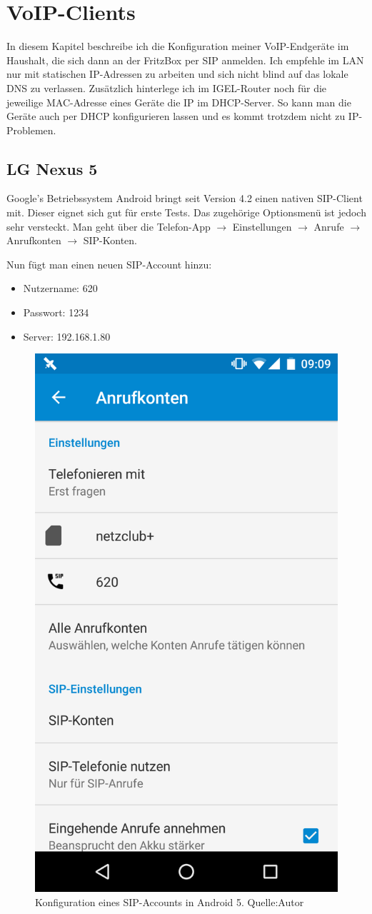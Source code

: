 \documentclass[a4paper,12pt]{scrbook}
\begin{document}
\section{VoIP-Clients}
In diesem Kapitel beschreibe ich die Konfiguration meiner VoIP-Endgeräte im Haushalt, die sich dann an der FritzBox per SIP anmelden. Ich empfehle im LAN nur mit statischen
IP-Adressen zu arbeiten und sich nicht blind auf das lokale DNS zu verlassen. Zusätzlich hinterlege ich im IGEL-Router noch für die jeweilige MAC-Adresse eines Geräte die 
IP im DHCP-Server. So kann man die Geräte auch per DHCP konfigurieren lassen und es kommt trotzdem nicht zu IP-Problemen.

\subsection{LG Nexus 5}
Google's Betriebssystem Android bringt seit Version 4.2 einen nativen SIP-Client mit. Dieser eignet sich gut für erste Tests. Das zugehörige Optionsmenü ist jedoch sehr versteckt.
Man geht über die Telefon-App $\rightarrow$ Einstellungen $\rightarrow$ Anrufe $\rightarrow$ Anrufkonten $\rightarrow$ SIP-Konten.

Nun fügt man einen neuen SIP-Account hinzu:
\begin{itemize}
 \item Nutzername: 620
 \item Passwort: 1234
 \item Server: 192.168.1.80
\end{itemize}

\begin{figure}[H]
\begin{center}
\includegraphics[width=.4\hsize]{./images/voip-client-nexus5.png}
\end{center}
\caption[Konfiguration eines SIP-Accounts in Android 5]
{\label{voip-client-nexus5}Konfiguration eines SIP-Accounts in Android 5. Quelle:Autor}
\end{figure}
\end{document}

